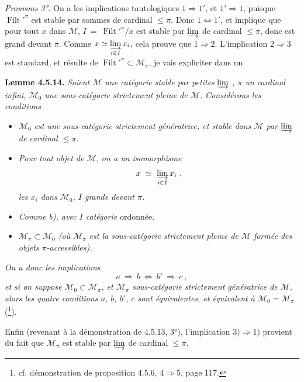\documentclass[11pt]{article}
\newcommand{\printedpage}[1]{\marginpar{\footnotesize p.~#1}}
\newcommand{\msp}[1]{\marginpar{\footnotesize [#1]}}
\newcommand{\Filt}{\operatorname{Filt}}
\begin{document}
\textit{Prouvons 3°.} On a les implications tautologiques $1 \Longrightarrow 1'$, et $1' \Longrightarrow 1$, puisque $\Filt'^{\pi}$ est stable par sommes de cardinal $\leqslant \pi$. Donc $1 \Longleftrightarrow 1'$, et implique que pour tout $x$ dans $\mathcal{M}$,
\msp{page 133}
$I \ = \ \Filt'^{\pi}/x$ est stable par $\varinjlim$ de cardinal $\leqslant \pi$, donc est grand devant $\pi$. Comme $x \simeq \varinjlim\limits_{i\in I} x_i$, cela prouve que $1 \Longrightarrow 2$. L'implication $2 \Longrightarrow 3$ est standard, et résulte de $\Filt'^{\pi} \subset \mathcal{M}_{\pi}$, je vais expliciter dans un

\textbf{Lemme 4.5.14.} \textit{Soient $\mathcal{M}$ une catégorie stable par petites} $\varinjlim$ \textit{, $\pi$ un cardinal infini, $\mathcal{M}_0$ une sous-catégorie strictement pleine de $\mathcal{M}$. Considérons les conditions}
\begin{itemize}
\item[\textit{a)}] \textit{$\mathcal{M}_0$ est une sous-catégorie strictement génératrice, et stable dans $\mathcal{M}$ par} $\varinjlim$ \textit{de cardinal $\leqslant \pi$.}
\item[\textit{b)}] \textit{Pour tout objet de $\mathcal{M}$, on a un isomorphisme}
\[ x \ \simeq \ \varinjlim_{i\in I} x_i \ , \]
\textit{les $x_i$ dans $\mathcal{M}_0$, $I$ grande devant $\pi$.}

\printedpage{42}
\item[\textit{b$'$)}] \textit{Comme b), avec $I$ catégorie} ordonnée.
\item[\textit{c)}] \textit{$\mathcal{M}_{\pi} \subset \mathcal{M}_0$ (où $\mathcal{M}_{\pi}$ est la sous-catégorie strictement pleine de $\mathcal{M}$ formée des objets $\pi$-accessibles).}
\end{itemize}
\textit{On a donc les implications}
\[ a \ \Longrightarrow \ b \ \Longleftrightarrow \ b' \ \Longrightarrow \ c \ , \]
\textit{et si on suppose $\mathcal{M}_0 \subset \mathcal{M}_{\pi}$, et $\mathcal{M}_{\pi}$ sous-catégorie strictement génératrice de $\mathcal{M}$, alors les quatre conditions $a$, $b$, $b'$, $c$ sont équivalentes, et équivalent à $\mathcal{M}_0 = \mathcal{M}_{\pi}$} (\footnote{cf. démonstration de proposition 4.5.6, $4 \Longrightarrow 5$, page 117.}).

\msp{page 134}
Enfin (revenant à la démonstration de 4.5.13, 3°), l'implication $3) \Longrightarrow 1)$ provient du fait que $\mathcal{M}_{\pi}$ est stable par $\varinjlim$ de cardinal $\leqslant \pi$.
\end{document}
